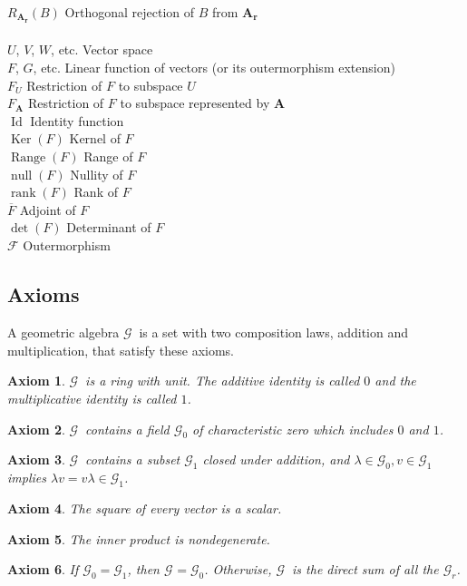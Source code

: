 \documentclass{utarticle}
\newcommand{\G}[1][]{\ensuremath{\mathcal{G}_{#1}}}
\newcommand{\bl}[1]{\ensuremath{\bm{#1}}}
\newcommand{\Id}{\operatorname{Id}}
\newcommand{\Ker}{\operatorname{Ker}}
\newcommand{\Range}{\operatorname{Range}}
\newcommand{\rank}{\operatorname{rank}}
\newcommand{\nullity}{\operatorname{null}}
\newcommand{\adj}[1]{\ensuremath{\overline{#1}}}
\newtheorem{axiom}{Axiom}
\begin{document}
\begin{tabbing}
$R_{\bl{A_r}}(B)$ \> Orthogonal rejection of $B$ from \bl{A_r} \\
\\
$U$, $V$, $W$, etc. \> Vector space \\
$F$, $G$, etc. \> Linear function of vectors (or its outermorphism extension) \\
$F_U$ \> Restriction of $F$ to subspace $U$ \\
$F_{\bl{A}}$ \> Restriction of $F$ to subspace represented by \bl{A} \\
$\Id$ \> Identity function \\
$\Ker(F)$ \> Kernel of $F$ \\
$\Range(F)$ \> Range of $F$ \\
$\nullity(F)$ \> Nullity of $F$ \\
$\rank(F)$ \> Rank of $F$ \\ 
\adj{F} \> Adjoint of $F$ \\
$\det(F)$ \> Determinant of $F$ \\
$\mathcal{F}$ \> Outermorphism 
\end{tabbing}

\subsection{Axioms}
\label{app:axioms}

A geometric algebra \G\ is a set with two composition laws, addition and multiplication, 
that satisfy these axioms.

\begin{axiom}
\G\ is a ring with unit.  The additive identity is called $0$ and 
the multiplicative identity is called $1$.
\end{axiom}
\begin{axiom}
\G\ contains a field \G[0] of characteristic zero which includes $0$ 
and $1$.
\end{axiom}
\begin{axiom}
\G\ contains a subset $\G[1]$ closed under addition, and 
 $\lambda \in \G[0], v \in \G[1]$ implies $\lambda v = v \lambda \in \G[1]$.
\end{axiom}
\begin{axiom}
The square of every vector is a scalar.
\end{axiom}
\begin{axiom}
The inner product is nondegenerate.
\end{axiom}
\begin{axiom}
If $\G[0] = \G[1]$, then $\G = \G[0]$.  Otherwise, \G\ is the direct sum of all the \G[r].
\end{axiom}
\end{document}
